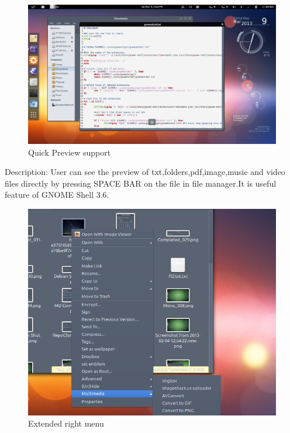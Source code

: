 \begin{figure}[h]
\begin{center}
  \includegraphics[scale=0.33] {8.png}
  \caption[Screenshot - Quick Preview]{Quick Preview support}
\end{center}
\end{figure}
Description: User can see the preview of txt,folders,pdf,image,music and video files directly by pressing SPACE BAR on the file in file manager.It is useful feature of GNOME Shell 3.6.
\newpage
\begin{figure}[h]
\begin{center}
  \includegraphics[scale=0.4] {9.png}
  \caption[Screenshot - Extended Right Menu]{Extended right menu}
\end{center}
\end{figure}
